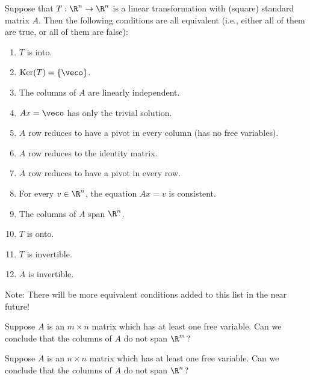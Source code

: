{}  Suppose that $T: \R^n \rightarrow \R^n$ is a linear transformation
with (square) standard matrix $A$.  Then the following conditions are all equivalent (i.e., either all of
them are true, or all of them are false):

\begin{enumerate}
\item $T$ is into.
\item $\mathrm{Ker}(T) = \{ \veco \}$.  
\item The columns of $A$ are linearly independent. 
\item $Ax = \veco$ has only the trivial solution.
\item $A$ row reduces to have a pivot in every column (has no free variables).  
\item $A$ row reduces to the identity matrix.  
\item $A$ row reduces to have a pivot in every row.  
\item For every $v\in \R^n$, the equation $Ax = v$ is consistent.
\item The columns of $A$ span $\R^n$.  
\item $T$ is onto.  
\item $T$ is invertible.
\item $A$ is invertible.

\end{enumerate}

Note: There will be more equivalent conditions added to this list in the near future!  


\endedxtext




Suppose $A$ is an $m\times n$ matrix which has at least one free variable.  Can we conclude that the columns of 
$A$ do not span $\R^m$?  


Suppose $A$ is an $n\times n$ matrix which has at least one free variable. Can we conclude that the columns of $A$ do not span $\R^n$?  


\endedxproblem



